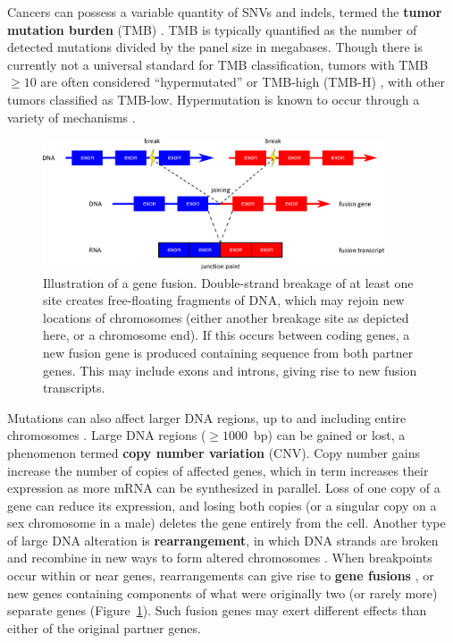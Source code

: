 Cancers can possess a variable quantity of SNVs and indels, termed the \textbf{tumor mutation burden} (TMB) \cite{merino2020}. TMB is typically quantified as the number of detected mutations divided by the panel size in megabases. Though there is currently not a universal standard for TMB classification, tumors with TMB $\ge 10$ are often considered ``hypermutated'' or TMB-high (TMB-H) \cite{shao2020,keytrudafda2017}, with other tumors classified as TMB-low. Hypermutation is known to occur through a variety of mechanisms \cite{campbell2017}.

\begin{figure}[htb]
    \centering
    \includegraphics[width=0.9\textwidth,keepaspectratio]{images/intro/fusion_example}
    \caption[Illustration of a gene fusion.]{Illustration of a gene fusion. Double-strand breakage of at least one site creates free-floating fragments of DNA, which may rejoin new locations of chromosomes (either another breakage site as depicted here, or a chromosome end). If this occurs between coding genes, a new fusion gene is produced containing sequence from both partner genes. This may include exons and introns, giving rise to new fusion transcripts.}
    \label{fig:intro:fusion_schematic}
\end{figure}
Mutations can also affect larger DNA regions, up to and including entire chromosomes \cite{hastings2009}. Large DNA regions ($\ge 1000$~bp) can be gained or lost, a phenomenon termed \textbf{copy number variation} (CNV)\@. Copy number gains increase the number of copies of affected genes, which in term increases their expression as more mRNA can be synthesized in parallel. Loss of one copy of a gene can reduce its expression, and losing both copies (or a singular copy on a sex chromosome in a male) deletes the gene entirely from the cell. Another type of large DNA alteration is \textbf{rearrangement}, in which DNA strands are broken and recombine in new ways to form altered chromosomes \cite{hasty2014}. When breakpoints occur within or near genes, rearrangements can give rise to \textbf{gene fusions} \cite{rabbitts1994,osborne2007}, or new genes containing components of what were originally two (or rarely more) separate genes (Figure~\ref{fig:intro:fusion_schematic}). Such fusion genes may exert different effects than either of the original partner genes.

